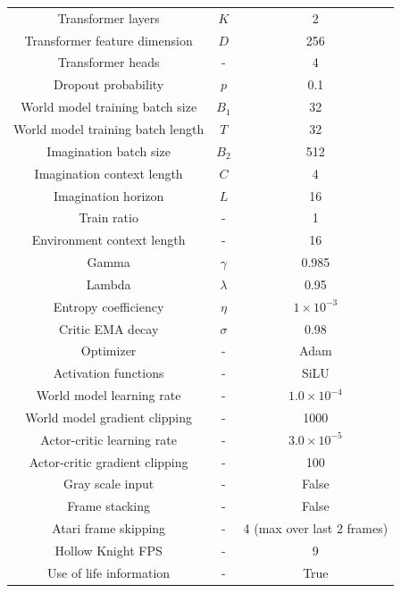 \begin{longtable}{ccc}
    Transformer layers & $K$ & 2\\
    Transformer feature dimension & $D$ & 256 \\
    Transformer heads & - & 4 \\
    Dropout probability & $p$ & 0.1 \\
    \midrule
    World model training batch size & $B_1$ & 32 \\
    World model training batch length & $T$ & 32 \\
    Imagination batch size & $B_2$ & 512 \\
    Imagination context length & $C$ & 4 \\
    Imagination horizon & $L$ & 16 \\
    Train ratio & - & 1 \\
    Environment context length & - & 16 \\
    \midrule
    Gamma & $\gamma$ & 0.985\\
    Lambda & $\lambda$ & 0.95\\
    Entropy coefficiency & $\eta$ & $1\times 10^{-3}$\\
    Critic EMA decay & $\sigma$ & 0.98\\
    \midrule
    Optimizer & - & Adam \citep{kingma_adam_2015} \\
    Activation functions & - & SiLU \citep{elfwing_silu_2017} \\
    World model learning rate & - & $1.0 \times 10^{-4}$\\
    World model gradient clipping & - & 1000 \\
    Actor-critic learning rate & - & $3.0 \times 10^{-5}$\\
    Actor-critic gradient clipping & - & 100 \\
    \midrule
    Gray scale input & - & False \\
    Frame stacking & - & False \\
    Atari frame skipping & - & 4 (max over last 2 frames) \\
    Hollow Knight FPS & - & 9 \\
    Use of life information & - & True \\
\end{longtable}

\newpage
